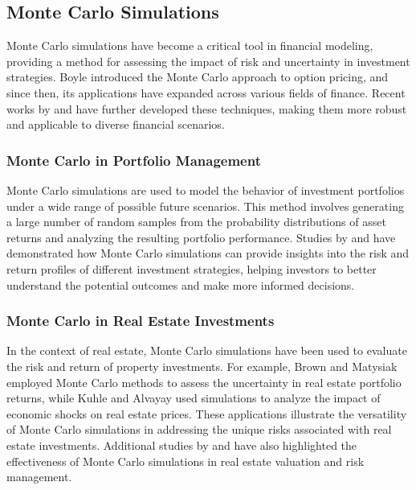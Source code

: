 \subsection{Monte Carlo Simulations}
Monte Carlo simulations have become a critical tool in financial modeling, providing a method for assessing the impact of risk and uncertainty in investment strategies. Boyle \citep{boyle1977options} introduced the Monte Carlo approach to option pricing, and since then, its applications have expanded across various fields of finance. Recent works by \citet{glasserman2004monte} and \citet{kreps2019applications} have further developed these techniques, making them more robust and applicable to diverse financial scenarios.

\subsubsection{Monte Carlo in Portfolio Management}
Monte Carlo simulations are used to model the behavior of investment portfolios under a wide range of possible future scenarios. This method involves generating a large number of random samples from the probability distributions of asset returns and analyzing the resulting portfolio performance. Studies by \citet{glasserman2004monte} and \citet{chan2005monte} have demonstrated how Monte Carlo simulations can provide insights into the risk and return profiles of different investment strategies, helping investors to better understand the potential outcomes and make more informed decisions.

\subsubsection{Monte Carlo in Real Estate Investments}
In the context of real estate, Monte Carlo simulations have been used to evaluate the risk and return of property investments. For example, Brown and Matysiak \citep{brown2000real} employed Monte Carlo methods to assess the uncertainty in real estate portfolio returns, while Kuhle and Alvayay \citep{kuhle2021economic} used simulations to analyze the impact of economic shocks on real estate prices. These applications illustrate the versatility of Monte Carlo simulations in addressing the unique risks associated with real estate investments. Additional studies by \citet{case2003dynamic} and \citet{ling2009real} have also highlighted the effectiveness of Monte Carlo simulations in real estate valuation and risk management.


